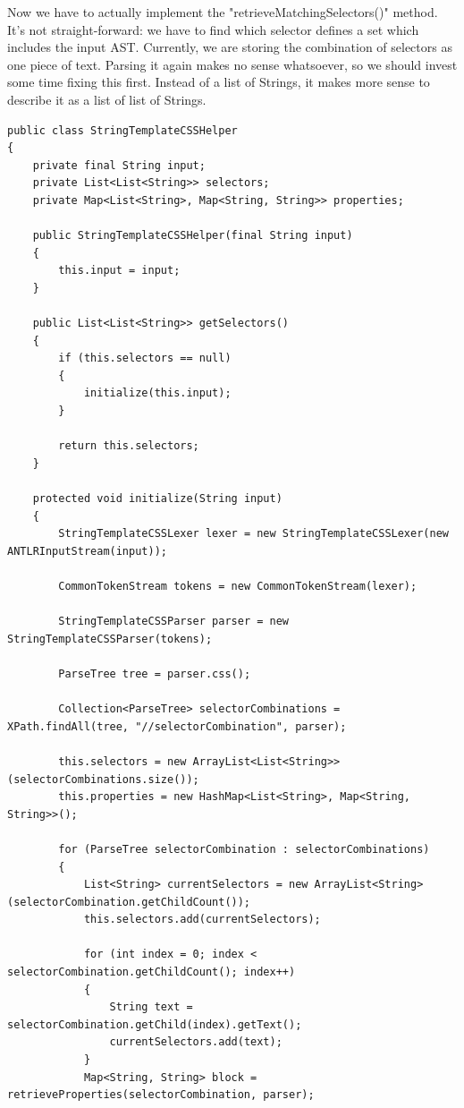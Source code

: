 \documentclass[11pt]{article}
\begin{document}
Now we have to actually implement the "retrieveMatchingSelectors()" method. It's not straight-forward: we
have to find which selector defines a set which includes the input AST. Currently, we are storing the combination of 
selectors as one piece of text. Parsing it again makes no sense whatsoever, so we should invest some time fixing this first.
Instead of a list of Strings, it makes more sense to describe it as a list of list of Strings.

\begin{verbatim}
public class StringTemplateCSSHelper
{
    private final String input;
    private List<List<String>> selectors;
    private Map<List<String>, Map<String, String>> properties;

    public StringTemplateCSSHelper(final String input)
    {
        this.input = input;
    }

    public List<List<String>> getSelectors()
    {
        if (this.selectors == null)
        {
            initialize(this.input);
        }

        return this.selectors;
    }

    protected void initialize(String input)
    {
        StringTemplateCSSLexer lexer = new StringTemplateCSSLexer(new ANTLRInputStream(input));

        CommonTokenStream tokens = new CommonTokenStream(lexer);

        StringTemplateCSSParser parser = new StringTemplateCSSParser(tokens);

        ParseTree tree = parser.css();

        Collection<ParseTree> selectorCombinations = XPath.findAll(tree, "//selectorCombination", parser);

        this.selectors = new ArrayList<List<String>>(selectorCombinations.size());
        this.properties = new HashMap<List<String>, Map<String, String>>();

        for (ParseTree selectorCombination : selectorCombinations)
        {
            List<String> currentSelectors = new ArrayList<String>(selectorCombination.getChildCount());
            this.selectors.add(currentSelectors);

            for (int index = 0; index < selectorCombination.getChildCount(); index++)
            {
                String text = selectorCombination.getChild(index).getText();
                currentSelectors.add(text);
            }
            Map<String, String> block = retrieveProperties(selectorCombination, parser);


\end{verbatim}
\end{document}
